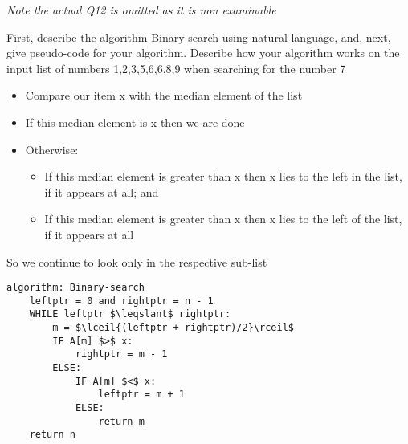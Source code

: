 \documentclass[addpoints]{exam}
\begin{document}
\begin{questions}
\newpage
\textit{Note the actual Q12 is omitted as it is non examinable}

\question[10]First, describe the algorithm Binary-search using natural language, and, next, give pseudo-code for your algorithm. Describe how your algorithm works on the input list of numbers 1,2,3,5,6,6,8,9 when searching for the number 7
\begin{solution}[2in]
	\begin{itemize}
		\item Compare our item x with the median element of the list
		\item If this median element is x then we are done
		\item Otherwise:
		\begin{itemize}
			\item If this median element is greater than x then x lies to the left in the list, if it appears at all; and
			\item If this median element is greater than x then x lies to the left of the list, if it appears at all
		\end{itemize}
	\end{itemize}
So we continue to look only in the respective sub-list
\begin{lstlisting}[tabsize=4,mathescape]
algorithm: Binary-search
	leftptr = 0 and rightptr = n - 1
	WHILE leftptr $\leqslant$ rightptr:
		m = $\lceil{(leftptr + rightptr)/2}\rceil$
		IF A[m] $>$ x:
			rightptr = m - 1
		ELSE:
			IF A[m] $<$ x:
				leftptr = m + 1
			ELSE:
				return m
	return n
\end{lstlisting}
\end{solution}


\end{questions}
\end{document}
